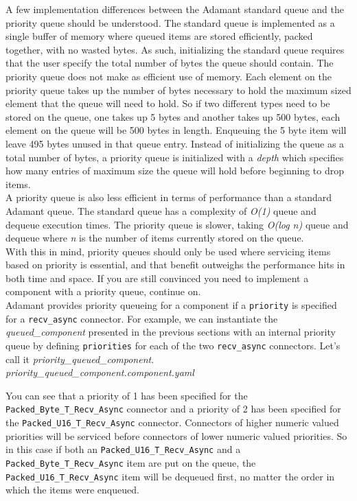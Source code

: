 A few implementation differences between the Adamant standard queue and the priority queue should be understood. The standard queue is implemented as a single buffer of memory where queued items are stored efficiently, packed together, with no wasted bytes. As such, initializing the standard queue requires that the user specify the total number of bytes the queue should contain. The priority queue does not make as efficient use of memory. Each element on the priority queue takes up the number of bytes necessary to hold the maximum sized element that the queue will need to hold. So if two different types need to be stored on the queue, one takes up 5 bytes and another takes up 500 bytes, each element on the queue will be 500 bytes in length. Enqueuing the 5 byte item will leave 495 bytes unused in that queue entry. Instead of initializing the queue as a total number of bytes, a priority queue is initialized with a \textit{depth} which specifies how many entries of maximum size the queue will hold before beginning to drop items. \\

A priority queue is also less efficient in terms of performance than a standard Adamant queue. The standard queue has a complexity of \textit{O(1)} queue and dequeue execution times. The priority queue is slower, taking \textit{O(log n)} queue and dequeue where \textit{n} is the number of items currently stored on the queue. \\

With this in mind, priority queues should only be used where servicing items based on priority is essential, and that benefit outweighs the performance hits in both time and space. If you are still convinced you need to implement a component with a priority queue, continue on. \\

Adamant provides priority queueing for a component if a \texttt{priority} is specified for a \texttt{recv\_async} connector. For example, we can instantiate the \textit{queued\_component} presented in the previous sections with an internal priority queue by defining \texttt{priorities} for each of the two \texttt{recv\_async} connectors. Let's call it \textit{priority\_queued\_component}. \\

\textit{priority\_queued\_component.component.yaml}

You can see that a priority of 1 has been specified for the \texttt{Packed\_Byte\_T\_Recv\_Async} connector and a priority of 2 has been specified for the \texttt{Packed\_U16\_T\_Recv\_Async} connector. Connectors of higher numeric valued priorities will be serviced before connectors of lower numeric valued priorities. So in this case if both an \texttt{Packed\_U16\_T\_Recv\_Async} and a \texttt{Packed\_Byte\_T\_Recv\_Async} item are put on the queue, the \texttt{Packed\_U16\_T\_Recv\_Async} item will be dequeued first, no matter the order in which the items were enqueued. \\

